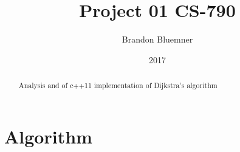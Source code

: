 \documentclass[12pt]{article}
\begin{document}
\title{Project 01 CS-790}
\author{Brandon Bluemner}
\date{2017}
\maketitle
\begin{abstract}
Analysis and of c++11 implementation of Dijkstra's algorithm
\end{abstract}
\section[Algorithm]{Algorithm}
\end{document}
